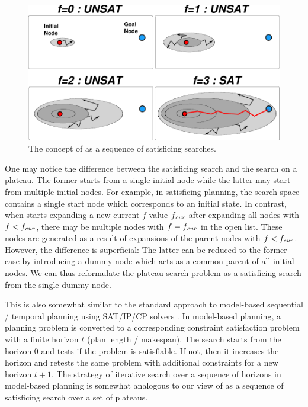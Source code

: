 \begin{figure}[htbp]
 \centering
 \includegraphics[width=0.8\linewidth]{img/astar/plateau-5.pdf}
 \caption{The concept of \astar as a sequence of satisficing searches.}
 \label{fig:astar-sat}
\end{figure}

One may notice the difference between the satisficing search and the search on a plateau.
The former starts from a single initial node while the latter may start from multiple initial nodes.
For example, in satisficing planning, the search space contains a single start node which corresponds to an initial state.
% 
In contrast, when \astar starts expanding a new current $f$ value $f_{\mit{cur}}$ after expanding all nodes with $f<f_\mit{cur}$,
there may be multiple nodes with $f=f_\mit{cur}$ in the open list.
These nodes are generated as a result of expansions of the parent nodes with $f<f_\mit{cur}$.
% 
However, the difference is superficial: The latter can be reduced to the former case by introducing a dummy node
which acts as a common parent of all initial nodes. We can thus reformulate the plateau search problem as a satisficing search from the single dummy node.

This is also somewhat similar to the standard approach to model-based sequential / temporal planning using SAT/IP/CP solvers \cite{kautz1992planning,van2005optiplan}.
In model-based planning, a
planning problem is converted to a corresponding constraint satisfaction problem with a finite horizon $t$ (plan
length / makespan). The search starts from the horizon 0 and tests if the problem is satisfiable. If not, then it
increases the horizon and retests the same problem with additional constraints for a new horizon $t+1$. 
The strategy of iterative search over a sequence of horizons in model-based planning is somewhat analogous to our view of \astar as a sequence of satisficing search over a set of plateaus.

